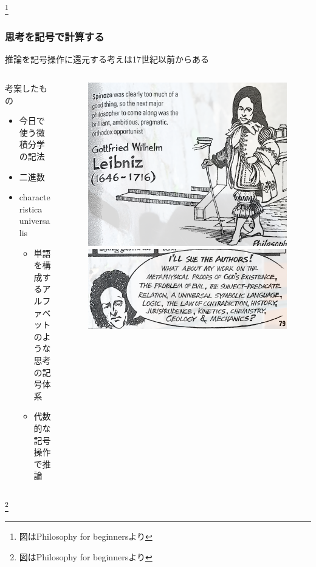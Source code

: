 \documentclass[unicode, 14pt, aspectratio=169]{beamer}
\newcommand\blfootnote[1]{%
  \begingroup
  \renewcommand\thefootnote{}\footnote{#1}%
  \addtocounter{footnote}{-1}%
  \endgroup
}
\begin{document}
\begin{frame}
\begin{columns}
\begin{column}{0.2\textwidth}
\begin{figure}
      \end{figure}       
    \end{column} 
  \end{columns}
  \blfootnote{図はPhilosophy for beginners\supercite{philosophy-for-begginers}より}
\end{frame}
\begin{frame}
  \frametitle{思考を記号で計算する}
  {\large 推論を記号操作に還元する考えは17世紀以前からある}  
  \begin{columns}
    \begin{column}{0.55\textwidth}
      考案したもの
      \begin{itemize}
        \item 今日で使う微積分学の記法
        \item 二進数
        \item characteristica universalis
          \begin{itemize}
          \item 単語を構成するアルファベットのような思考の記号体系
          \item 代数的な記号操作で推論
          \end{itemize}
      \end{itemize}
    \end{column}    
    \begin{column}{0.4\textwidth}
      \begin{figure}
        \includegraphics[width=0.7\linewidth]{images/leibniz.png}
        \includegraphics[width=0.7\linewidth]{images/universal.png}
      \end{figure}       
    \end{column} 
  \end{columns}
  \blfootnote{図はPhilosophy for beginners\supercite{philosophy-for-begginers}より}  
\end{frame}
\end{document}
